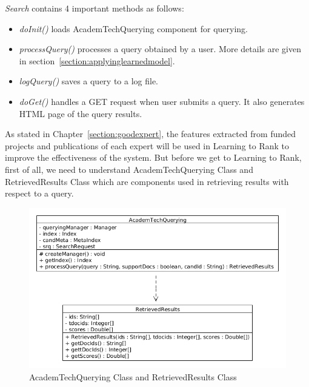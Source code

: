 \textit{Search} contains 4 important methods as follows: 
\begin{itemize}
 \item \textit{doInit()} loads AcademTechQuerying component for querying.
 \item \textit{processQuery()} processes a query obtained by a user. More details are given in section~\ref{section:applyinglearnedmodel}.
 \item \textit{logQuery()} saves a query to a log file.
 \item \textit{doGet()} handles a GET request when user submits a query. It also generates HTML page of the query results.
\end{itemize}

As stated in Chapter~\ref{section:goodexpert}, the features extracted from funded projects and publications of each expert will be used in Learning to Rank
to improve the effectiveness of the system. But before we get to Learning to Rank, first of all, we need to understand
AcademTechQuerying Class and RetrievedResults Class which are components used in retrieving results with respect to a query. 
\begin{figure}
\centering
\includegraphics[scale=0.3]{./figures/AcademTechQuerying.png}
\caption{AcademTechQuerying Class and RetrievedResults Class} \label{fig:AcademTechQuerying} 
\end{figure}


